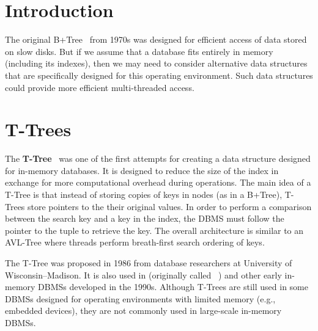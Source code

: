 \documentclass[11pt]{article}
\newcommand{\rr}[1]{\textcolor{red}{#1}}
\begin{document}
\maketitle
\thispagestyle{plain}

\section{Introduction}
The original B+Tree~\cite{comer79} from 1970s was designed for efficient access of data stored on 
slow disks. But if we assume that a database fits entirely in memory (including its indexes), 
then we may need to consider alternative data structures that are specifically designed for this 
operating environment. Such data structures could provide more efficient multi-threaded access.



\section{T-Trees}
The \textbf{T-Tree}~\cite{P294} was one of the first attempts for creating a data structure 
designed for in-memory databases. It is designed to reduce the size of the index in exchange for 
more computational overhead during operations. The main idea of a T-Tree is that instead of 
storing copies of keys in nodes (as in a B+Tree), T-Trees store pointers to the their original 
values. In order to perform a comparison between the search key and a key in the index, the DBMS 
must follow the pointer to the tuple to retrieve the key. The overall architecture is similar to an 
AVL-Tree where threads perform breath-first search ordering of keys.

The T-Tree was proposed in 1986 from database researchers at University of 
Wisconsin--Madison. It is also used in  (originally called 
~\cite{heytens95}) and other early in-memory DBMSs developed in the 1990s.
Although T-Trees are still used in some DBMSs designed for operating environments with limited 
memory (e.g., embedded devices), they are not commonly used in large-scale in-memory DBMSs. 
\end{document}
